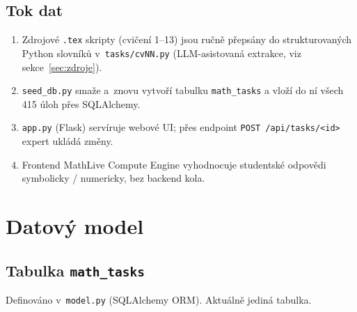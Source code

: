 \documentclass[11pt,a4paper]{article}
\begin{document}
\subsection{Tok dat}

\begin{enumerate}
  \item Zdrojové \texttt{.tex} skripty (cvičení 1--13) jsou ručně přepsány do strukturovaných Python slovníků v~\texttt{tasks/cvNN.py} (LLM-asistovaná extrakce, viz sekce~\ref{sec:zdroje}).
  \item \texttt{seed\_db.py} smaže a~znovu vytvoří tabulku \texttt{math\_tasks} a vloží do ní všech 415 úloh přes SQLAlchemy.
  \item \texttt{app.py} (Flask) servíruje webové UI; přes endpoint \texttt{POST /api/tasks/<id>} expert ukládá změny.
  \item Frontend MathLive Compute Engine vyhodnocuje studentské odpovědi symbolicky / numericky, bez backend kola.
\end{enumerate}

\section{Datový model}

\subsection{Tabulka \texttt{math\_tasks}}

Definováno v~\texttt{model.py} (SQLAlchemy ORM). Aktuálně jediná tabulka.
\end{document}
